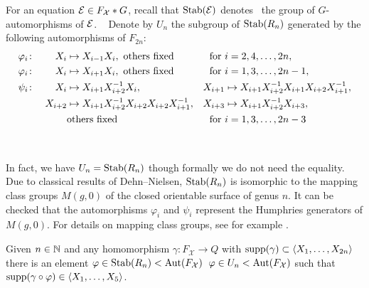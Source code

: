 \documentclass[a4paper,11pt]{amsart}
\newcommand\replaceTh[2]{\st{#1}{\color{DeepPink1}\ #2}}
\newcommand\replace[2]{\st{#1}{\color{Green4}\ #2}}
\begin{document}
For an equation $\mathcal{E}\in F_{\mathcal X}*G$, recall that
$\operatorname{Stab}(\mathcal{E})$ denotes \replace{}{the} group of $G$-automorphisms of $\mathcal{E}$.
\replace{}{
  Denote by $U_n$ the subgroup of $\operatorname{Stab}(R_n)$ generated by the following automorphisms of $F_{2n}$:
 \begin{align*}
  \varphi_i&\colon& X_i&\mapsto X_{i-1}X_i, \textup{ others fixed} & \textup{for }&i=2,4,\dotsc,2n , \\
  \varphi_i&\colon&X_i&\mapsto X_{i+1}X_i, \textup{ others fixed} & \textup{for }&i=1,3,\dotsc,2n-1 ,\\
  \psi_i&\colon&X_i&\mapsto X_{i+1}X_{i+2}^{-1}X_i, &X_{i+1}&\mapsto X_{i+1}X_{i+2}^{-1}X_{i+1}X_{i+2}X_{i+1}^{-1},\\  
  &&X_{i+2}&\mapsto X_{i+1}X_{i+2}^{-1}X_{i+2}X_{i+2}X_{i+1}^{-1}, &X_{i+3}&\mapsto X_{i+1}X_{i+2}^{-1}X_{i+3},\\
           &&&\textup{others fixed} & \textup{for }&i=1,3,\dotsc,2n-3 \\  
\end{align*}
}
\replace{}{
\begin{re}
In fact, we have $U_n = \operatorname{Stab}(R_n)$ though formally we do not need the equality. 
Due to classical results of Dehn--Nielsen, $\operatorname{Stab}(R_n)$ is isomorphic to 
the mapping class groups $M(g,0)$ of the closed orientable surface of genus $n$. It can be checked that
the automorphisms $\varphi_i$ and $\psi_i$ represent the Humphries generators of $M(g,0)$.
For details on mapping class groups, see for example \cite{Farb-Margalit:MCG}.
\end{re}
}
\begin{lem}\label{lem:finitelyManyConstraints}
 Given $n\in \mathbb{N}$ and any homomorphism $\gamma\colon F_{\mathcal{X}} \to Q$ with $\operatorname{{supp}}(\gamma) \subset \left<X_1,\ldots ,X_{2n}\right>$
 there is an element \replaceTh{$\varphi \in \operatorname{Stab}(R_n)<\operatorname{{Aut}}(F_{\mathcal{X}})$}{$\varphi \in U_n<\operatorname{{Aut}}(F_{\mathcal{X}})$} such that $\operatorname{{supp}}(\gamma\circ\varphi) \in \left<X_1,\dotsc,X_5\right>$.
\end{lem}
\end{document}
